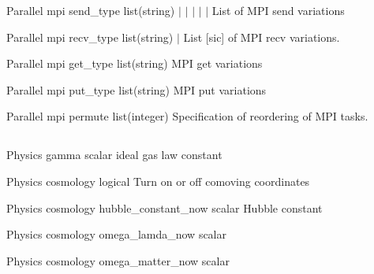 \documentclass{article}
\begin{document}
\Parameter
{Parallel}
{mpi}
{send\_type}
{list(string)}
{  $|$  $|$  $|$  $|$  $|$ }
{List of MPI send variations}
{}
{}

\Parameter
{Parallel}
{mpi}
{recv\_type}
{list(string)} 	
{ $|$ }
{List [sic] of MPI recv variations.} 
{}
{}

\Parameter
{Parallel}
{mpi}
{get\_type}
{list(string)}
{}
{MPI get variations}
{}
{}

\Parameter
{Parallel}
{mpi}
{put\_type}
{list(string)}
{}
{MPI put variations}
{}
{}

\Parameter
{Parallel}
{mpi}
{permute}
{list(integer)}
{}
{Specification of reordering of MPI tasks. }
{}
{}

\subsection{}

\Parameter
{Physics}
{}
{gamma}
{scalar}
{}
{ideal gas law constant}
{}
{}

\Parameter
{Physics}
{}
{cosmology}
{logical}
{}
{Turn on or off comoving coordinates}
{}
{}

\Parameter
{Physics}
{cosmology}
{hubble\_constant\_now}
{scalar}
{}
{Hubble constant}
{}
{}

\Parameter
{Physics}
{cosmology}
{omega\_lamda\_now}
{scalar}
{}
{}
{}
{}

\Parameter
{Physics}
{cosmology}
{omega\_matter\_now}
{scalar}
{}
{}
{}
{}
\end{document}
